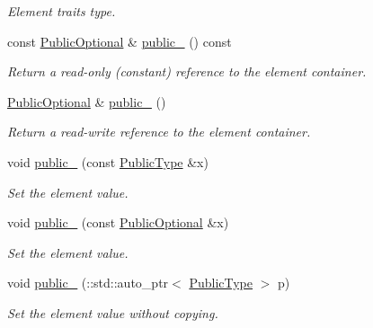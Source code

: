 \begin{DoxyCompactItemize}
\begin{DoxyCompactList}\small\item\em Element traits type. \item\end{DoxyCompactList}\item 
const \hyperlink{classopenstack_1_1xml_1_1Addresses_a92f6f7282346412c4c85b46340dba3a6}{PublicOptional} \& \hyperlink{classopenstack_1_1xml_1_1Addresses_ad023bdfcdee682add71162d15cd35d7f}{public\_\-} () const 
\begin{DoxyCompactList}\small\item\em Return a read-\/only (constant) reference to the element container. \item\end{DoxyCompactList}\item 
\hyperlink{classopenstack_1_1xml_1_1Addresses_a92f6f7282346412c4c85b46340dba3a6}{PublicOptional} \& \hyperlink{classopenstack_1_1xml_1_1Addresses_a1fbe66afc57a6b910c1546d8c384c852}{public\_\-} ()
\begin{DoxyCompactList}\small\item\em Return a read-\/write reference to the element container. \item\end{DoxyCompactList}\item 
void \hyperlink{classopenstack_1_1xml_1_1Addresses_a3c512ae0811940d8eafc8886fac4d228}{public\_\-} (const \hyperlink{classopenstack_1_1xml_1_1AddressList}{PublicType} \&x)
\begin{DoxyCompactList}\small\item\em Set the element value. \item\end{DoxyCompactList}\item 
void \hyperlink{classopenstack_1_1xml_1_1Addresses_afbeb896267a352b2eadaa6d1cee9c219}{public\_\-} (const \hyperlink{classopenstack_1_1xml_1_1Addresses_a92f6f7282346412c4c85b46340dba3a6}{PublicOptional} \&x)
\begin{DoxyCompactList}\small\item\em Set the element value. \item\end{DoxyCompactList}\item 
void \hyperlink{classopenstack_1_1xml_1_1Addresses_a91e3d50cb5458ad2eda3d2f210631399}{public\_\-} (::std::auto\_\-ptr$<$ \hyperlink{classopenstack_1_1xml_1_1AddressList}{PublicType} $>$ p)
\begin{DoxyCompactList}\small\item\em Set the element value without copying. \item\end{DoxyCompactList}\end{DoxyCompactItemize}
